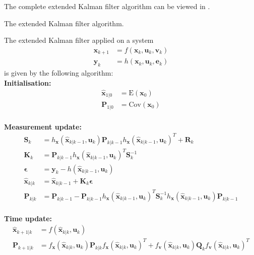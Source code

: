 The complete extended Kalman filter algorithm can be viewed in .
\begin{algorithm}
\label{alg:EKF}
\caption{The extended Kalman filter algorithm.}
  The extended Kalman filter applied on a system
    \begin{align*}
    \boldsymbol{x}_{k+1} &= f(\boldsymbol{x}_{k},\boldsymbol{u}_{k}, \boldsymbol{v}_{k})\\
    \boldsymbol{y}_{k} &= h(\boldsymbol{x}_{k},\boldsymbol{u}_{k},\boldsymbol{e}_{k})
    \end{align*} is given by the following algorithm:\\
    \textbf{Initialisation:}
    \begin{align*}
    \hat{\boldsymbol{x}}_{1|0} &= \text{E}(\boldsymbol{x}_{0})\\
    \boldsymbol{P}_{1|0} &= \text{Cov}(\boldsymbol{x}_{0})\\
    \end{align*}
     
    \textbf{Measurement update:}
    \begin{align*}
    \boldsymbol{S}_{k} &= h_{\boldsymbol{x}}(\hat{\boldsymbol{x}}_{k|k-1},\boldsymbol{u}_{k}) \boldsymbol{P}_{k|k-1} h_{\boldsymbol{x}}(\hat{\boldsymbol{x}}_{k|k-1},\boldsymbol{u}_{k})^{T} + \boldsymbol{R}_{k}\\
    \boldsymbol{K}_{k} &= \boldsymbol{P}_{k|k-1} h_{\boldsymbol{x}}(\hat{\boldsymbol{x}}_{k|k-1},\boldsymbol{u}_{k})^{T} \boldsymbol{S}_{k}^{-1}\\
    \boldsymbol{\epsilon} &= \boldsymbol{y}_{k} - h(\hat{\boldsymbol{x}}_{k|k-1},\boldsymbol{u}_{k})\\
    \hat{\boldsymbol{x}}_{k|k} &= \hat{\boldsymbol{x}}_{k|k-1} + \boldsymbol{K}_{k}\boldsymbol{\epsilon}\\
    \boldsymbol{P}_{k|k} &= \boldsymbol{P}_{k|k-1} - \boldsymbol{P}_{k|k-1} h_{\boldsymbol{x}}(\hat{\boldsymbol{x}}_{k|k-1},\boldsymbol{u}_{k})^{T} \boldsymbol{S}_{k}^{-1} h_{\boldsymbol{x}}(\hat{\boldsymbol{x}}_{k|k-1},\boldsymbol{u}_{k}) \boldsymbol{P}_{k|k-1}\\
    \end{align*}
    
   \textbf{Time update:}
    \begin{align*}
    \hat{\boldsymbol{x}}_{k+1|k} &= f(\hat{\boldsymbol{x}}_{k|k},\boldsymbol{u}_{k})\\
    \boldsymbol{P}_{k+1|k} &= f_{\boldsymbol{x}}(\hat{\boldsymbol{x}}_{k|k},\boldsymbol{u}_ {k})\boldsymbol{P}_{k|k} f_{\boldsymbol{x}}(\hat{\boldsymbol{x}}_{k|k},\boldsymbol{u}_{k})^{T} + f_{\boldsymbol{v}}(\hat{\boldsymbol{x}}_{k|k},\boldsymbol{u}_{k}) \boldsymbol{Q}_{k} f_{\boldsymbol{v}}(\hat{\boldsymbol{x}}_{k|k},\boldsymbol{u}_{k})^{T}
    \end{align*}    
\end{algorithm}

